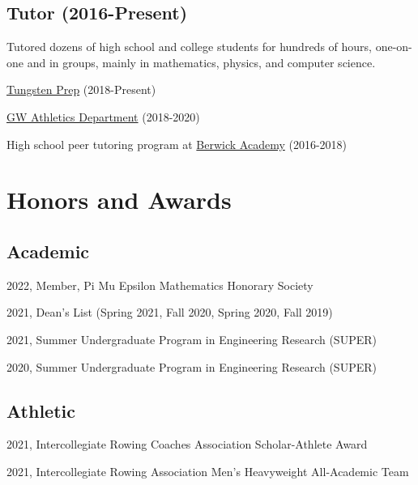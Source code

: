 \documentclass[letterpaper]{article}
\renewenvironment{itemize}{
  \begin{list}{}{
    \setlength{\leftmargin}{1.5em}
  }
}{
  \end{list}
}
\begin{document}
\subsection*{Tutor (2016-Present)}
Tutored dozens of high school and college students for hundreds of hours, one-on-one and in groups, mainly in mathematics, physics, and computer science. 
\begin{itemize}
\item
\href{https://www.tungstenprep.com/}{Tungsten Prep} (2018-Present) 
\item
\href{https://gwsports.com/sports/2018/7/23/school-bio-academic-support-tutor-info-html.aspx}{GW Athletics Department} (2018-2020) 
\item 
High school peer tutoring program at \href{https://www.berwickacademy.org/}{Berwick Academy} (2016-2018)
\end{itemize}


\section*{Honors and Awards}

\subsection*{Academic}
\begin{itemize}
\item 2022, Member, Pi Mu Epsilon Mathematics Honorary Society
\item 2021, Dean's List (Spring 2021, Fall 2020, Spring 2020, Fall 2019)
\item 2021, Summer Undergraduate Program in Engineering Research (SUPER)
\item 2020, Summer Undergraduate Program in Engineering Research (SUPER)
\end{itemize}
\subsection*{Athletic}
\begin{itemize}
\item 2021, Intercollegiate Rowing Coaches Association Scholar-Athlete Award
\item 2021, Intercollegiate Rowing Association Men's Heavyweight All-Academic Team
\end{itemize}
\end{document}
